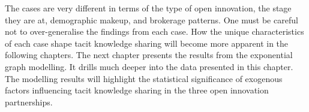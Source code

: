 The cases are very different in terms of the type of open innovation, the stage they are at, demographic makeup, and brokerage patterns. One must be careful not to over-generalise the findings from each case. How the unique characteristics of each case shape tacit knowledge sharing will become more apparent in the following chapters. The next chapter presents the results from the exponential graph modelling. It drills much deeper into the data presented in this chapter. The modelling results will highlight the statistical significance of exogenous factors influencing tacit knowledge sharing in the three open innovation partnerships. 